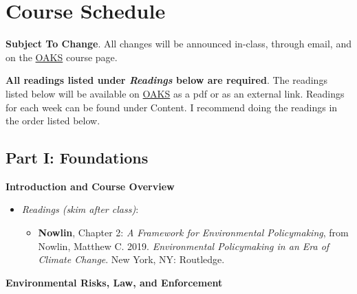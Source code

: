\hypertarget{course-schedule}{%
\section{Course Schedule}\label{course-schedule}}

\textbf{Subject To Change}. All changes will be announced in-class,
through email, and on the \href{https://lms.cofc.edu}{OAKS} course page.

\vspace{0.10in}

\noindent \textbf{All readings listed under \emph{Readings} below are
required}. The readings listed below will be available on
\href{https://lms.cofc.edu}{OAKS} as a pdf or as an external link.
Readings for each week can be found under Content. I recommend doing the
readings in the order listed below.

\SetDate[06/01/2022]

\hypertarget{part-i-foundations}{%
\subsection{Part I: Foundations}\label{part-i-foundations}}

\week \textbf{Introduction and Course Overview}

\begin{itemize}

\item
  \emph{Readings (skim after class)}:

  \begin{itemize}
  
  \item
    \textbf{Nowlin}, Chapter 2: \emph{A Framework for Environmental
    Policymaking}, from Nowlin, Matthew C. 2019. \emph{Environmental
    Policymaking in an Era of Climate Change}. New York, NY: Routledge.
  \end{itemize}
\end{itemize}

\week \textbf{Environmental Risks, Law, and Enforcement}

